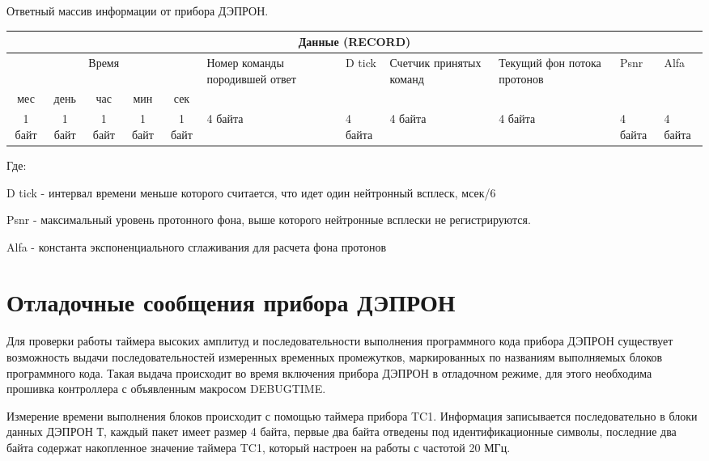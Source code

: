 Ответный массив информации от прибора ДЭПРОН.
\footnotesize
\begin{center}
	\begin{tabularx}{\textwidth}{|*5{c|}|*6{X|}}
		\hline
		\multicolumn{11}{|c|}{Данные 
		(RECORD)}                                                                                                                            \\ \hline
		\multicolumn{5}{|c|}{Время}                & Номер команды породившей ответ & D tick  & Счетчик принятых команд & Текущий фон потока протонов & Psnr    
		& Alfa    \\ \cline{1-5}
		 мес   &  день  &  час   &  мин   &  сек   &                                &         &                         &                             &         
		 &  \\ \hline
		1 байт & 1 байт & 1 байт & 1 байт & 1 байт & 4 байта                        & 4 байта & 4 байта                 & 4 байта                     & 4 байта 
		& 4 байта \\ \hline
	\end{tabularx}  
\end{center}
\normalsize



	Где:


	D tick - интервал времени меньше которого считается, что идет один нейтронный всплеск, мсек/6
	
	Psnr - максимальный уровень протонного фона, выше которого нейтронные всплески не регистрируются.
	
	Alfa - константа экспоненциального сглаживания для расчета фона протонов





\section{Отладочные сообщения прибора ДЭПРОН}



Для проверки работы таймера высоких амплитуд и последовательности выполнения программного кода прибора ДЭПРОН существует возможность выдачи последовательностей измеренных временных промежутков, маркированных по названиям выполняемых блоков программного кода. Такая выдача происходит во время включения прибора ДЭПРОН в отладочном режиме, для этого необходима прошивка контроллера с объявленным макросом DEBUGTIME.


Измерение времени выполнения блоков происходит с помощью таймера прибора TC1. Информация записывается последовательно в блоки данных ДЭПРОН Т, каждый пакет имеет размер 4 байта, первые два байта отведены под идентификационные символы, последние два байта содержат накопленное значение таймера TC1, который настроен на работы с частотой 20 МГц.

